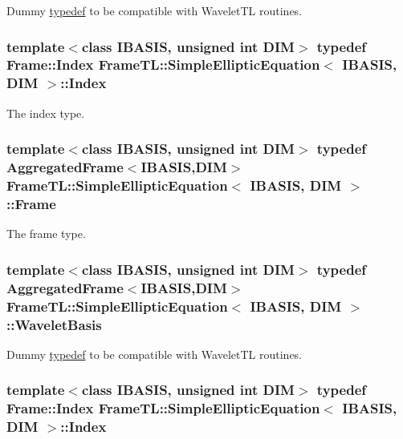 Dummy \hyperlink{structtypedef}{typedef} to be compatible with WaveletTL routines. \hypertarget{classFrameTL_1_1SimpleEllipticEquation_763214b72b98926356eebe8b7f6da678}{
\subsubsection[Index]{\setlength{\rightskip}{0pt plus 5cm}template$<$class IBASIS, unsigned int DIM$>$ {\bf typedef} {\bf Frame::Index} {\bf FrameTL::SimpleEllipticEquation}$<$ IBASIS, DIM $>$::{\bf Index}}}
\label{classFrameTL_1_1SimpleEllipticEquation_763214b72b98926356eebe8b7f6da678}


The index type. \hypertarget{classFrameTL_1_1SimpleEllipticEquation_b048afa8f64d6e76d33b1ae60686010a}{
\subsubsection[Frame]{\setlength{\rightskip}{0pt plus 5cm}template$<$class IBASIS, unsigned int DIM$>$ {\bf typedef} {\bf AggregatedFrame}$<$IBASIS,DIM$>$ {\bf FrameTL::SimpleEllipticEquation}$<$ IBASIS, DIM $>$::{\bf Frame}}}
\label{classFrameTL_1_1SimpleEllipticEquation_b048afa8f64d6e76d33b1ae60686010a}


The frame type. \hypertarget{classFrameTL_1_1SimpleEllipticEquation_59ee36b9fe6e6aab5b0947de8487c95e}{
\subsubsection[WaveletBasis]{\setlength{\rightskip}{0pt plus 5cm}template$<$class IBASIS, unsigned int DIM$>$ {\bf typedef} {\bf AggregatedFrame}$<$IBASIS,DIM$>$ {\bf FrameTL::SimpleEllipticEquation}$<$ IBASIS, DIM $>$::{\bf WaveletBasis}}}
\label{classFrameTL_1_1SimpleEllipticEquation_59ee36b9fe6e6aab5b0947de8487c95e}


Dummy \hyperlink{structtypedef}{typedef} to be compatible with WaveletTL routines. \hypertarget{classFrameTL_1_1SimpleEllipticEquation_763214b72b98926356eebe8b7f6da678}{
\subsubsection[Index]{\setlength{\rightskip}{0pt plus 5cm}template$<$class IBASIS, unsigned int DIM$>$ {\bf typedef} {\bf Frame::Index} {\bf FrameTL::SimpleEllipticEquation}$<$ IBASIS, DIM $>$::{\bf Index}}}
\label{classFrameTL_1_1SimpleEllipticEquation_763214b72b98926356eebe8b7f6da678}


